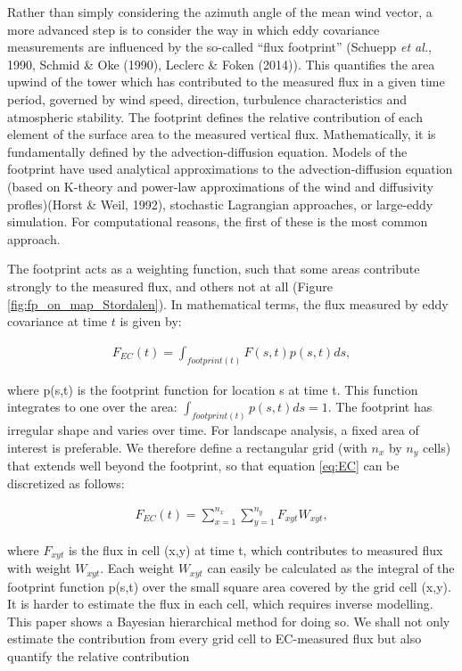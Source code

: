 Rather than simply considering the azimuth angle of the mean wind
vector, a more advanced step is to consider the way in which eddy
covariance measurements are influenced by the so-called ``flux
footprint'' (Schuepp \emph{et al.}, 1990, Schmid \& Oke (1990), Leclerc
\& Foken (2014)). This quantifies the area upwind of the tower which has
contributed to the measured flux in a given time period, governed by
wind speed, direction, turbulence characteristics and atmospheric
stability. The footprint defines the relative contribution of each
element of the surface area to the measured vertical flux.
Mathematically, it is fundamentally defined by the advection-diffusion
equation. Models of the footprint have used analytical approximations to
the advection-diffusion equation (based on K-theory and power-law
approximations of the wind and diffusivity profles)(Horst \& Weil,
1992), stochastic Lagrangian approaches, or large-eddy simulation. For
computational reasons, the first of these is the most common approach.

The footprint acts as a weighting function, such that some areas
contribute strongly to the measured flux, and others not at all (Figure
\ref{fig:fp_on_map_Stordalen}). In mathematical terms, the flux
measured by eddy covariance at time \(t\) is given by:

\begin{align}   \label{eq:EC}
  F_{EC}(t) = \int_{footprint(t)} F(s,t) p(s,t) d s,
\end{align}

where p(s,t) is the footprint function for location s at time t. This function integrates to one over the area: \(\int_{footprint(t)} p(s,t) d s = 1\). The footprint has irregular shape and varies over time. For landscape analysis, a fixed area of interest is preferable. We therefore define a rectangular grid (with \(n_x\) by \(n_y\) cells) that extends well beyond the footprint, so that equation \ref{eq:EC} can be discretized as follows:

\begin{align}   \label{eq:weightMean}
  F_{EC}(t) = \sum_{x = 1}^{n_x} \sum_{y = 1}^{n_y} F_{xyt} W_{xyt},
\end{align}

where \(F_{xyt}\) is the flux in cell (x,y) at time t, which contributes to measured flux with weight \(W_{xyt}\). Each weight \(W_{xyt}\) can easily be calculated as the integral of the footprint function p(s,t) over the small square area covered by the grid cell (x,y). It is harder to estimate the flux in each cell, which requires inverse modelling. This paper shows a Bayesian hierarchical method for doing so. We shall not only estimate the contribution from every grid cell to EC-measured flux but also quantify the relative contribution


